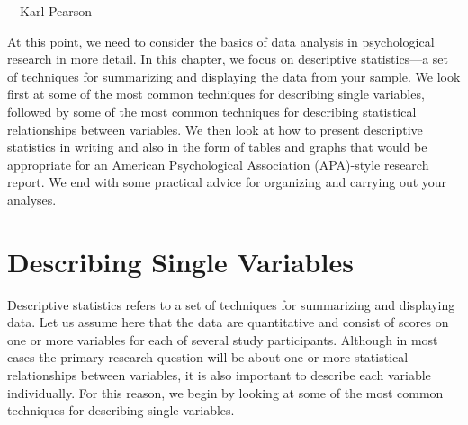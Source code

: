  {---Karl Pearson}

At this point, we need to consider the basics of data analysis in psychological research in more detail. In this chapter, we focus on descriptive statistics---a set of techniques for summarizing and displaying the data from your sample. We look first at some of the most common techniques for describing single variables, followed by some of the most common techniques for describing statistical relationships between variables. We then look at how to present descriptive statistics in writing and also in the form of tables and graphs that would be appropriate for an American Psychological Association (APA)-style research report. We end with some practical advice for organizing and carrying out your analyses.

\section{Describing Single Variables}




Descriptive statistics refers to a set of techniques for summarizing and displaying data. Let us assume here that the data are quantitative and consist of scores on one or more variables for each of several study participants. Although in most cases the primary research question will be about one or more statistical relationships between variables, it is also important to describe each variable individually. For this reason, we begin by looking at some of the most common techniques for describing single variables.




